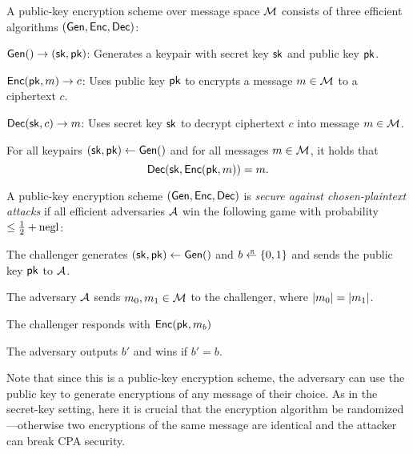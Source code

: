 \begin{definition}
	A public-key encryption scheme over message space $\mathcal{M}$ 
  consists of three efficient algorithms $(\mathsf{Gen}, \mathsf{Enc}, \mathsf{Dec})$:
	\begin{compactitem}
    \item $\mathsf{Gen}() \to ({\mathsf{sk}}, \mathsf{pk})$: Generates a keypair with secret key ${\mathsf{sk}}$ and public key $\mathsf{pk}$.
    \item $\mathsf{Enc}(\mathsf{pk}, m) \to c$: Uses public key $\mathsf{pk}$ to encrypts a message $m \in \mathcal{M}$ 
            to a ciphertext $c$.
    \item $\mathsf{Dec}({\mathsf{sk}}, c) \to m$: Uses secret key ${\mathsf{sk}}$ to decrypt ciphertext $c$ into message $m \in \mathcal{M}$.
	\end{compactitem}
\end{definition}

\begin{definition}
For all keypairs $({\mathsf{sk}}, \mathsf{pk}) \gets \mathsf{Gen}()$ and for all messages $m \in \mathcal{M}$,
it holds that $$\mathsf{Dec}({\mathsf{sk}}, \mathsf{Enc}(\mathsf{pk}, m)) = m.$$
\end{definition}

\begin{definition}
  A public-key encryption scheme $(\mathsf{Gen}, \mathsf{Enc}, \mathsf{Dec})$ is \emph{secure against chosen-plaintext attacks}
  if all efficient adversaries $\mathcal{A}$ 
  win the following game with probability $\leq \tfrac{1}{2} + \operatorname{negl}$:

	\begin{compactitem}
  \item The challenger generates $({\mathsf{sk}}, \mathsf{pk}) \gets \mathsf{Gen}()$ and $b \getsr \bin$ and sends 
        the public key $\mathsf{pk}$ to $\mathcal{A}$.
  \item The adversary $\mathcal{A}$ sends $m_0, m_1 \in \mathcal{M}$ to the challenger,
        where $\left| m_0 \right| = \left| m_1 \right|$.
  \item The challenger responds with $\mathsf{Enc}(\mathsf{pk}, m_b)$		
  \item The adversary outputs $b'$ and wins if $b' = b$.
	\end{compactitem}
\end{definition}
Note that since this is a public-key encryption
scheme, the adversary can use the public key to
generate encryptions of any message of their choice. 
As in the secret-key setting, here it is crucial that
the encryption algorithm be randomized---otherwise
two encryptions of the same message are identical
and the attacker can break CPA security.


